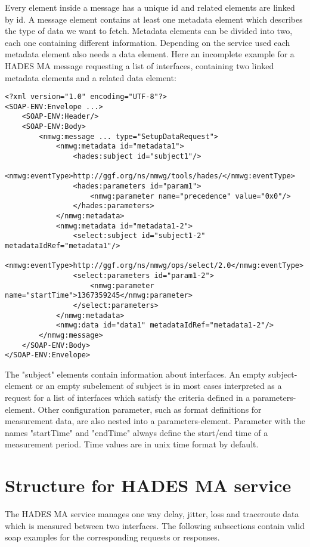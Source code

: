 \documentclass[a4paper,12pt,titlepage,hidelinks,fleqn]{article}
\begin{document}
\begin{flushleft}
Every element inside a message has a unique id and related elements are linked by id.
A message element contains at least one metadata element which describes the type of data we want to fetch. Metadata elements can be divided into two, each one containing different information. Depending on the service used each metadata element also needs a data element. Here an incomplete example for a HADES MA message requesting a list of interfaces, containing two linked metadata elements and a related data element:
\begin{Block}
\begin{framed}
\begin{lstlisting}
<?xml version="1.0" encoding="UTF-8"?>
<SOAP-ENV:Envelope ...>
	<SOAP-ENV:Header/>
	<SOAP-ENV:Body>    
		<nmwg:message ... type="SetupDataRequest">
			<nmwg:metadata id="metadata1">
				<hades:subject id="subject1"/>
				<nmwg:eventType>http://ggf.org/ns/nmwg/tools/hades/</nmwg:eventType>
				<hades:parameters id="param1"> 
					<nmwg:parameter name="precedence" value="0x0"/>   	          
				</hades:parameters>
			</nmwg:metadata>
			<nmwg:metadata id="metadata1-2">
				<select:subject id="subject1-2" metadataIdRef="metadata1"/>
				<nmwg:eventType>http://ggf.org/ns/nmwg/ops/select/2.0</nmwg:eventType>
				<select:parameters id="param1-2">  
					<nmwg:parameter name="startTime">1367359245</nmwg:parameter>  	         
				</select:parameters>
			</nmwg:metadata>
			<nmwg:data id="data1" metadataIdRef="metadata1-2"/>		
		</nmwg:message>
	</SOAP-ENV:Body>
</SOAP-ENV:Envelope>
\end{lstlisting}
\end{framed}
\end{Block}
The "subject" elements contain information about interfaces. An empty subject-element or an empty subelement of subject is in most cases interpreted as a request for a list of interfaces which satisfy the criteria defined in a parameters-element. Other configuration parameter, such as format definitions for measurement data, are also nested into a parameters-element. Parameter with the names "startTime" and "endTime" always define the start/end time of a measurement period. Time values are in unix time format by default.
\end{flushleft}

\section{Structure for HADES MA service}
\begin{flushleft}
The HADES MA service manages one way delay, jitter, loss and traceroute data which is measured between two interfaces. The following subsections contain valid soap examples for the corresponding requests or responses.  
\end{flushleft}
\end{document}
